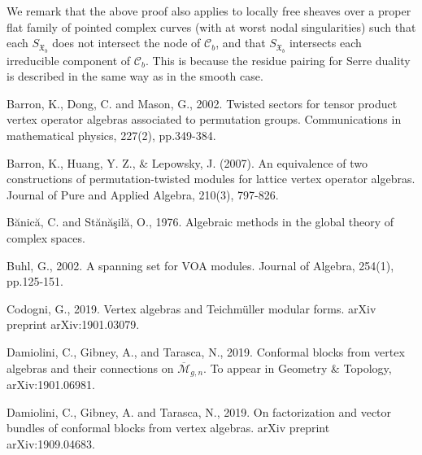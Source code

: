 \documentclass[12pt,a4paper,notitlepage]{article}
\theoremstyle{definition}
\theoremstyle{plain}
\newcommand{\fk}{\mathfrak}
\newcommand{\mc}{\mathcal}
\newcommand{\ovl}{\overline}
\numberwithin{equation}{section}
\begin{document}
We remark that the above proof also applies to locally free sheaves over a proper flat family of pointed complex curves (with at worst nodal singularities) such that each $S_{\fk X_b}$ does not intersect the node of $\mc C_b$, and that $S_{\fk X_b}$ intersects each irreducible component of $\mc C_b$. This is because the residue pairing for Serre duality is described in the same way as in the smooth case.
















\printindex	
	\begin{thebibliography}{999999}
		\footnotesize	
		
		
		
		

Barron, K., Dong, C. and Mason, G., 2002. Twisted sectors for tensor product vertex operator algebras associated to permutation groups. Communications in mathematical physics, 227(2), pp.349-384.


Barron, K., Huang, Y. Z., \& Lepowsky, J. (2007). An equivalence of two constructions of permutation-twisted modules for lattice vertex operator algebras. Journal of Pure and Applied Algebra, 210(3), 797-826.


Bănică, C. and Stănăşilă, O., 1976. Algebraic methods in the global theory of complex spaces.

		
Buhl, G., 2002. A spanning set for VOA modules. Journal of Algebra, 254(1), pp.125-151.

Codogni, G., 2019. Vertex algebras and Teichm\"uller modular forms. arXiv preprint arXiv:1901.03079.	


Damiolini, C., Gibney, A., and Tarasca, N., 2019. Conformal blocks from vertex algebras and their connections on $\ovl{\mc M}_{g,n}$.  To appear in Geometry \& Topology, arXiv:1901.06981.

Damiolini, C., Gibney, A. and Tarasca, N., 2019. On factorization and vector bundles of conformal blocks from vertex algebras. arXiv preprint arXiv:1909.04683.



\end{thebibliography}
\end{document}
